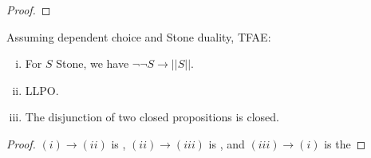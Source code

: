 \begin{proof}
\end{proof}

\begin{corollary}
Assuming dependent choice and Stone duality, TFAE:
\begin{enumerate}[(i)]
  \item For $S$ Stone, we have $\neg \neg S \to ||S||$. 
  \item LLPO.
  \item The disjunction of two closed propositions is closed. 
\end{enumerate}
\end{corollary}
\begin{proof}
  $(i) \to (ii)$ is , $(ii) \to (iii)$ is , 
  and $(iii) \to (i)$ is the 
\end{proof}
